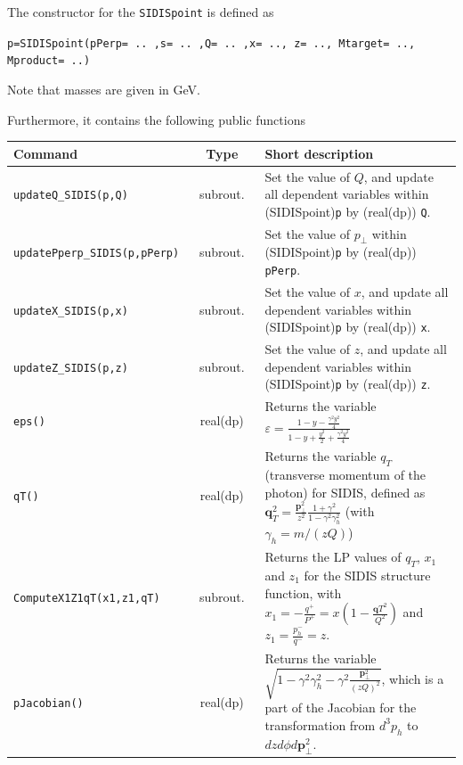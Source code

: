 \documentclass[prd,nofootinbib,eqsecnum,final]{revtex4}
\renewcommand{\(}{\left(}
\renewcommand{\)}{\right)}
\renewcommand{\[}{\left[}
\renewcommand{\]}{\right]}
\renewcommand{\vec}[1]{\bm{#1}}
\begin{document}
The constructor for the \texttt{SIDISpoint} is defined as 
\begin{center}
\texttt{p=SIDISpoint(pPerp= .. ,s= .. ,Q= .. ,x= .., z= .., Mtarget= .., Mproduct= ..)}
\end{center}
Note that masses are given in GeV.

Furthermore, it contains the following public functions
\begin{center}
\begin{tabular}{||p{5cm}|c|p{9cm}||}
\hline\hline
Command & ~~Type~~&  Short description
\\\hline
\texttt{updateQ\_SIDIS(p,Q)} & subrout. & Set the value of $Q$, and update all dependent variables within (SIDISpoint)\texttt{p} by (real(dp)) \texttt{Q}.
\\\hline
\texttt{updatePperp\_SIDIS(p,pPerp)} & subrout. & Set the value of $p_\perp$ within (SIDISpoint)\texttt{p} by (real(dp)) \texttt{pPerp}.
\\\hline
\texttt{updateX\_SIDIS(p,x)} & subrout. & Set the value of $x$, and update all dependent variables within (SIDISpoint)\texttt{p} by (real(dp)) \texttt{x}.
\\\hline
\texttt{updateZ\_SIDIS(p,z)} & subrout. & Set the value of $z$, and update all dependent variables within (SIDISpoint)\texttt{p} by (real(dp)) \texttt{z}.
\\\hline
\texttt{eps()} & real(dp) & Returns the variable $\varepsilon=\frac{1-y-\frac{\gamma^2 y^2}{4}}{1-y+\frac{y^2}{2}+\frac{\gamma^2 y^2}{4}}$
\\\hline
\texttt{qT()} & real(dp) & Returns the variable $q_T$ (transverse momentum of the photon) for SIDIS, defined as $\vec q_T^2=\frac{\vec p_\perp^2}{z^2} \frac{1+\gamma^2}{1-\gamma^2 \gamma_h^2}$ (with $\gamma_h=m/(zQ)$)
\\\hline
\texttt{ComputeX1Z1qT(x1,z1,qT)} & subrout. & Returns the LP values of $q_T$, $x_1$ and $z_1$ for the SIDIS structure function, with $x_1=-\frac{q^+}{P^+}=x(1-\frac{\vec qT^2}{Q^2})$ and $z_1=\frac{p_h^-}{q^-}=z$.
\\\hline
\texttt{pJacobian()} & real(dp) & Returns the variable $\sqrt{1-\gamma^2 \gamma_h^2-\gamma^2 \frac{\vec p_\perp^2}{(zQ)^2}}$, which is a part of the Jacobian for the transformation from $d^3p_h$ to $dz d\phi d\vec p_\perp^2$.
\\\hline\hline
\end{tabular}
\end{center}

\newpage
\end{document}
